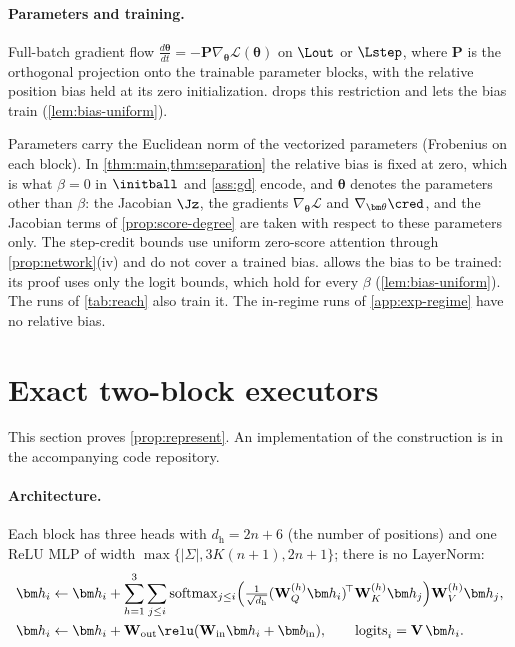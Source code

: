\paragraph{Parameters and training.}

\begin{assumption}[Training]
\label{ass:gd}
Full-batch gradient flow $\tfrac{d\bm\theta}{dt}=-\mathbf P\nabla_{\bm\theta}\mathcal L(\bm\theta)$ on $\Lout$ or $\Lstep$, where $\mathbf P$ is the orthogonal projection onto
the trainable parameter blocks, with the relative
position bias held at its zero initialization.  drops this restriction and lets the bias train (\cref{lem:bias-uniform}).
\end{assumption}

\label{rem:norms}Parameters carry the Euclidean norm of the vectorized parameters (Frobenius on
each block). In \cref{thm:main,thm:separation} the relative bias is fixed at zero, which is what $\beta=0$ in $\initball$ and
\cref{ass:gd} encode, and $\bm\theta$ denotes the parameters other than $\beta$: the Jacobian $\Jz$, the gradients $\nabla_{\bm\theta}\mathcal L$ and
$\nabla_{\bm\theta}\cred$, and the Jacobian terms of \cref{prop:score-degree} are taken with respect to these parameters only. The step-credit bounds use uniform
zero-score attention through \cref{prop:network}(iv) and do not cover a trained bias.  allows the bias to be
trained: its proof uses only the logit bounds, which hold for every $\beta$ (\cref{lem:bias-uniform}). The runs of \cref{tab:reach} also train it. The in-regime runs of \cref{app:exp-regime} have no relative bias.


\section{Exact two-block executors}
\label{app:architectures}

This section proves \cref{prop:represent}. An implementation of the construction is in the accompanying code repository.

\paragraph{Architecture.}
\label{app:construction}
\label{app:model}
Each block has three heads with $d_{\mathrm h}=2n+6$ (the number of positions) and one ReLU MLP of width $\max\{|\Sigma|,3K(n+1),2n+1\}$;
there is no LayerNorm:
\begin{align*}
 \bm h_i&\leftarrow \bm h_i+\sum_{h=1}^{3}\sum_{j\le i}\operatorname{softmax}_{j\le i}\Bigl(\tfrac{1}{\sqrt{d_{\mathrm h}}}(\mathbf W^{(h)}_Q\bm h_i)^{\!\top}\mathbf W^{(h)}_K\bm h_j\Bigr)\mathbf W^{(h)}_V\bm h_j,\\
 \bm h_i&\leftarrow \bm h_i+\mathbf W_{\mathrm{out}}\relu(\mathbf W_{\mathrm{in}}\bm h_i+\bm b_{\mathrm{in}}),\qquad \mathrm{logits}_i=\mathbf V\,\bm h_i .
\end{align*}

